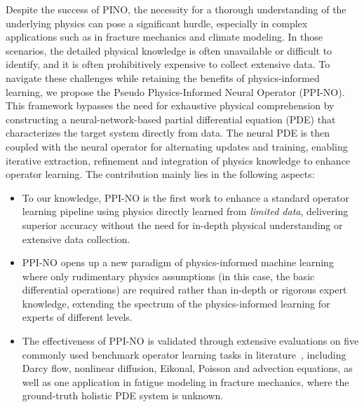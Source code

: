 Despite the success of PINO, the necessity for a thorough understanding of the underlying physics can pose a significant hurdle, especially in complex applications such as in fracture mechanics and climate modeling. In those scenarios, the detailed physical knowledge is often unavailable or difficult to identify, and it is often prohibitively expensive to collect extensive data. %
To navigate these challenges while retaining the benefits of physics-informed learning, we propose  the Pseudo Physics-Informed Neural Operator (PPI-NO). This  framework bypasses the need for exhaustive physical comprehension by constructing  a neural-network-based partial differential equation (PDE) that characterizes the target system directly from data. The neural PDE is then coupled with the neural operator for alternating updates and training,  enabling iterative extraction, refinement and integration of physics knowledge to enhance operator learning. %
The contribution mainly lies in the following aspects:
\begin{itemize}
\item To our knowledge, PPI-NO is the first work to enhance a standard operator learning pipeline using physics directly learned from \textit{limited data}, delivering superior accuracy without the need for in-depth physical understanding or extensive data collection.
\item PPI-NO opens up a new paradigm of physics-informed machine learning where only rudimentary physics assumptions (in this case, the basic differential operations) are required rather than in-depth or rigorous expert knowledge, extending the spectrum of the physics-informed learning for experts of different levels.
\item The effectiveness of PPI-NO is validated through extensive evaluations on five commonly used benchmark operator learning tasks in literature~\citep{li2020fourier,lu2022comprehensive}, including  Darcy flow, nonlinear diffusion, Eikonal, Poisson and advection equations, as well as one application in fatigue modeling in fracture mechanics, where the ground-truth holistic PDE system is unknown. 
\end{itemize}